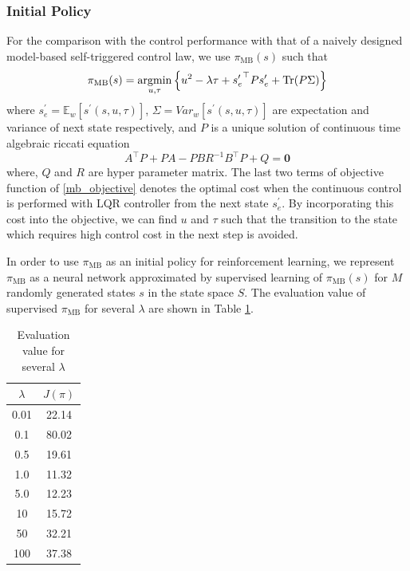 \documentclass[english, dvipdfmx]{ampmt}             %
\newcommand{\argmin}{\mathop{\rm argmin}\limits}
\newcommand{\expect}{\mathbb{E}}
\begin{document}
\subsubsection{Initial Policy}
For the comparison with the control performance with that of a naively designed model-based self-triggered control law, we use $\pi_{\textrm{MB}}(s)$ such that
\begin{equation}
	\pi_{\textrm{MB}}(s) = \argmin_{u,\tau} \left\{u^2 - \lambda\tau + {s^{\prime}_e}^{\top}Ps^{\prime} _e+ \textrm{Tr}(P\Sigma)\right\} \label{mb_objective}
\end{equation}
where $s^{\prime}_e=\expect_{w}[s^{\prime}(s,u,\tau)]$, $\Sigma=Var_w[s^{\prime}(s,u,\tau)]$ are  expectation and variance of next state respectively, and $P$ is a unique solution of continuous time algebraic riccati equation
\begin{equation}
	A^{\top}P + PA - PBR^{-1}B^{\top}P + Q = \bm{0}
\end{equation}
where, $Q$ and $R$ are hyper parameter matrix. The last two terms of objective function of \eqref{mb_objective} denotes the optimal cost when the continuous control is performed with LQR controller from the next state $s^{\prime}_e$. By incorporating this cost into the objective, we can find $u$ and $\tau$ such that the transition to the state which requires high control cost in the next step is avoided.\par %
In order to use $\pi_{\textrm{MB}}$ as an initial policy for reinforcement learning, we represent $\pi_{\textrm{MB}}$ as a neural network approximated by supervised learning of $\pi_{\textrm{MB}}(s)$ for $M$ randomly generated states $s$ in the state space $S$. The evaluation value of supervised $\pi_{\textrm{MB}}$ for several $\lambda$ are shown in Table \ref{ev}.
\begin{table}[htb]
  \begin{center}
    \begin{tabular}{|cc|} \hline
      $\lambda$ & $J(\pi)$ \\ \hline 
      0.01 & 22.14 \\
      0.1 & 80.02 \\ %
      0.5 & 19.61 \\
      1.0 & 11.32 \\
      5.0 & 12.23 \\
      10 & 15.72 \\
      50 & 32.21 \\
      100 & 37.38 \\ \hline
    \end{tabular}
    \caption{Evaluation value for several $\lambda$}
    \label{ev}
  \end{center}
\end{table}
\end{document}
